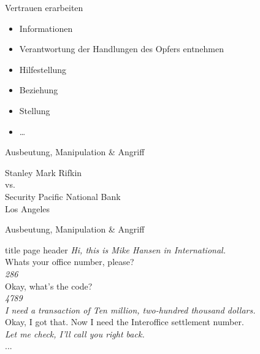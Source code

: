 \documentclass[11pt]{beamer}
\begin{document}
\begin{frame}{Vertrauen erarbeiten}
  \begin{itemize}
    \item Informationen
    \item Verantwortung der Handlungen des Opfers entnehmen
    \item Hilfestellung
    \item Beziehung
    \item Stellung
    \item \dots
  \end{itemize}
\end{frame}

\begin{frame}{Ausbeutung, Manipulation \& Angriff}
  \begin{center}
  {\Large
  Stanley Mark Rifkin\\
  vs.\\
  Security Pacific National Bank\\
  Los Angeles
  }
  \end{center}
\end{frame}

\begin{frame}{Ausbeutung, Manipulation \& Angriff}

\begin{beamercolorbox}[sep=1em]{title page header}
\textcolor{skyblue3}{\textit{\glqq{}Hi, this is Mike Hansen in International.\grqq{}}}\\

\glqq{}Whats your office number, please?\grqq{}\\

\textcolor{skyblue3}{\textit{\glqq{}286\grqq{}}}\\

\glqq{}Okay, what's the code?\grqq{}\\

\textcolor{skyblue3}{\textit{\glqq{}4789\grqq{}}}\\

\textcolor{skyblue3}{\textit{\glqq{}I need a transaction of Ten million, two-hundred thousand
dollars.\grqq{}}}\\

\glqq{}Okay, I got that. Now I need the Interoffice settlement number.\grqq{}\\

\textcolor{skyblue3}{\textit{\glqq{}Let me check, I'll call you right
back.\grqq{}}}\\
...

\end{beamercolorbox}
\end{frame}
\end{document}
